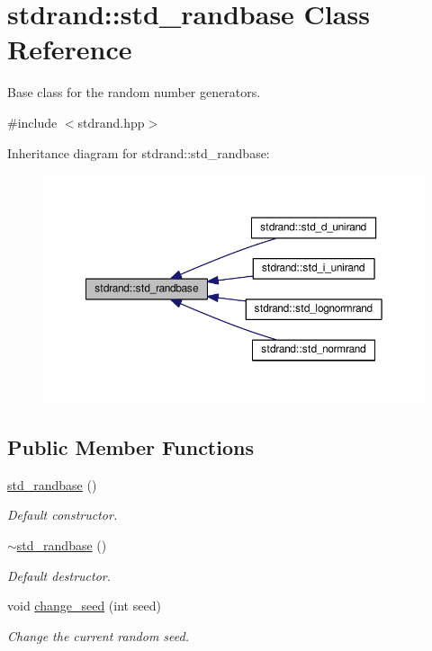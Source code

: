 \hypertarget{classstdrand_1_1std__randbase}{}\section{stdrand\+:\+:std\+\_\+randbase Class Reference}
\label{classstdrand_1_1std__randbase}


Base class for the random number generators.  




{\ttfamily \#include $<$stdrand.\+hpp$>$}



Inheritance diagram for stdrand\+:\+:std\+\_\+randbase\+:\nopagebreak
\begin{figure}[H]
\begin{center}
\leavevmode
\includegraphics[width=350pt]{d1/d27/classstdrand_1_1std__randbase__inherit__graph}
\end{center}
\end{figure}
\subsection*{Public Member Functions}
\begin{DoxyCompactItemize}
\item 
\hyperlink{classstdrand_1_1std__randbase_a8298d43186d6410f30ec0a77f0b90159}{std\+\_\+randbase} ()
\begin{DoxyCompactList}\small\item\em Default constructor. \end{DoxyCompactList}\item 
\hyperlink{classstdrand_1_1std__randbase_a5280080005689ab2ff6dae6de10a3faa}{$\sim$std\+\_\+randbase} ()
\begin{DoxyCompactList}\small\item\em Default destructor. \end{DoxyCompactList}\item 
void \hyperlink{classstdrand_1_1std__randbase_ae4d2a7ab5253b8d21ce4ede8f9988f24}{change\+\_\+seed} (int seed)
\begin{DoxyCompactList}\small\item\em Change the current random seed. \end{DoxyCompactList}\end{DoxyCompactItemize}
